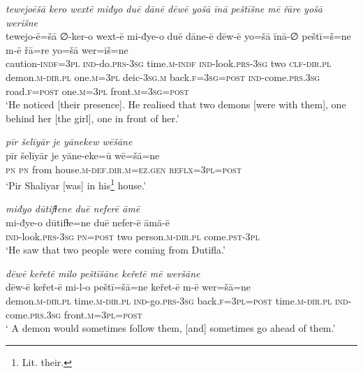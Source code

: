 \ea \label{ŽP.176}
\textit{tewejoēšā kero wextē miđyo duē dānē dēwē yošā īnā peštīšne mē řāre yošā werišne} \\ 
\gll tewejo-ē=šā ∅-ker-o wext-ē mi-đye-o duē dāne-ē dēw-ē yo=šā īnā-∅ peštī=š=ne m-ē řā=re yo=šā wer=iš=ne \\ 
 caution\textsc{-indf}\textsc{=3pl} \textsc{ind-}do\textsc{.prs}\textsc{-3sg} time\textsc{.m}\textsc{-indf} \textsc{ind-}look\textsc{.prs}\textsc{-3sg} two \textsc{clf}\textsc{-dir}\textsc{.pl} demon\textsc{.m}\textsc{-dir}\textsc{.pl} one\textsc{.m}\textsc{=3pl} deic\textsc{-3sg}\textsc{.m} back\textsc{.f}\textsc{=3sg}\textsc{=\textsc{post}} \textsc{ind-}come\textsc{.prs}\textsc{.3sg} road\textsc{.f}\textsc{=\textsc{post}} one\textsc{.m}\textsc{=3pl} front\textsc{.m}\textsc{=3sg}\textsc{=\textsc{post}} \\ 
\glt `He noticed [their presence]. He realised that two demons [were with them], one behind her [the girl], one in front of her.'
\z 
 
\ea \label{ŽP.188}
\textit{pīr šelīyār je yānekew wēšāne} \\ 
\gll pīr šelīyār je yāne-eke=ū wē=šā=ne \\ 
 \textsc{pn} \textsc{pn} from house\textsc{.m}\textsc{-def}\textsc{.dir}\textsc{.m}\textsc{\textsc{=ez.gen}} \textsc{reflx}\textsc{=3pl}\textsc{=\textsc{post}} \\ 
\glt `Pir Shaliyar [was] in his\footnote{Lit. their.} house.'
\z 
 
\ea \label{ŽP.191}
\textit{miđyo dūtifɫene duē neferē āmē} \\ 
\gll mi-đye-o dūtifɫe=ne duē nefer-ē āmā-ē \\ 
 \textsc{ind-}look\textsc{.prs}\textsc{-3sg} \textsc{pn}\textsc{=\textsc{post}} two person\textsc{.m}\textsc{-dir}\textsc{.pl} come\textsc{.pst}\textsc{-3pl} \\ 
\glt `He saw that two people were coming from Dutifla.'
\z 
 
\ea \label{ŽP.192}
\textit{dēwē keřetē milo peštīšāne keřetē mē weršāne} \\ 
\gll dēw-ē keřet-ē mi-l-o peštī=šā=ne keřet-ē m-ē wer=šā=ne \\ 
 demon\textsc{.m}\textsc{-dir}\textsc{.pl} time\textsc{.m}\textsc{-dir}\textsc{.pl} \textsc{ind-}go\textsc{.prs}\textsc{-3sg} back\textsc{.f}\textsc{=3pl}\textsc{=\textsc{post}} time\textsc{.m}\textsc{-dir}\textsc{.pl} \textsc{ind-}come\textsc{.prs}\textsc{.3sg} front\textsc{.m}\textsc{=3pl}\textsc{=\textsc{post}} \\ 
\glt ` A demon would sometimes follow them, [and] sometimes go ahead of them.'
\z 
 
